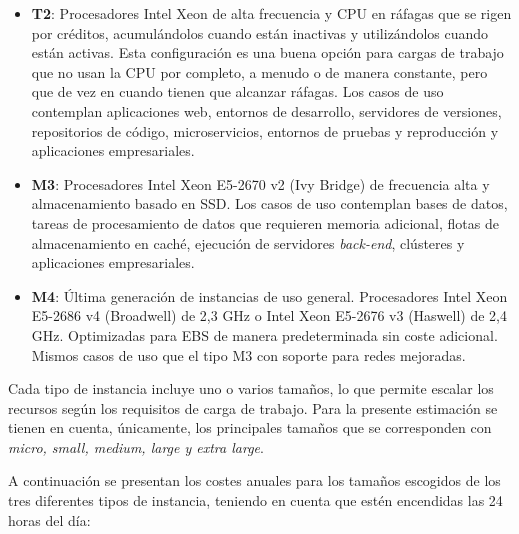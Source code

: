 \begin{itemize}
\item \textbf{T2}: Procesadores Intel Xeon de alta frecuencia y CPU en ráfagas que se rigen por créditos, acumulándolos cuando están inactivas y utilizándolos cuando están activas. Esta configuración es una buena opción para cargas de trabajo que no usan la CPU por completo, a menudo o de manera constante, pero que de vez en cuando tienen que alcanzar ráfagas. Los casos de uso contemplan aplicaciones web, entornos de desarrollo, servidores de versiones, repositorios de código, microservicios, entornos de pruebas y reproducción y aplicaciones empresariales.
\item \textbf{M3}: Procesadores Intel Xeon E5-2670 v2 (Ivy Bridge) de frecuencia alta y  almacenamiento basado en SSD. Los casos de uso contemplan bases de datos, tareas de procesamiento de datos que requieren memoria adicional, flotas de almacenamiento en caché, ejecución de servidores \textit{back-end}, clústeres y aplicaciones empresariales.
\item \textbf{M4}: Última generación de instancias de uso general. Procesadores Intel Xeon E5-2686 v4 (Broadwell) de 2,3 GHz o Intel Xeon E5-2676 v3 (Haswell) de 2,4 GHz. Optimizadas para EBS de manera predeterminada sin coste adicional. Mismos casos de uso que el tipo M3 con soporte para redes mejoradas.
\end{itemize}

Cada tipo de instancia incluye uno o varios tamaños, lo que permite escalar los recursos según los requisitos de carga de trabajo. Para la presente estimación se tienen en cuenta, únicamente, los principales tamaños que se corresponden con \textit{micro, small, medium, large y extra large}.

A continuación se presentan los costes anuales para los tamaños escogidos de los tres diferentes tipos de instancia, teniendo en cuenta que estén encendidas las 24 horas del día:

\FloatBarrier

